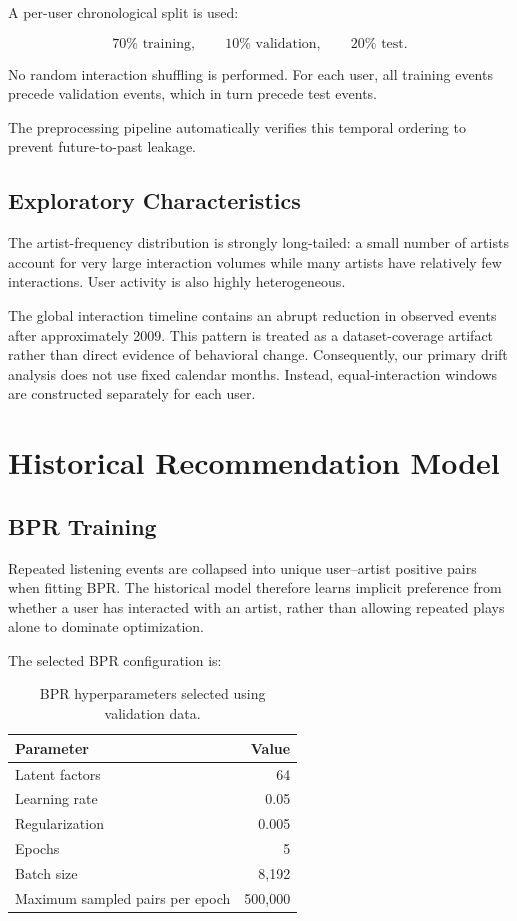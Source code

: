 \documentclass[11pt]{article}
\begin{document}
A per-user chronological split is used:

\[
70\% \text{ training},
\qquad
10\% \text{ validation},
\qquad
20\% \text{ test}.
\]

No random interaction shuffling is performed. For each user, all
training events precede validation events, which in turn precede test
events.

The preprocessing pipeline automatically verifies this temporal
ordering to prevent future-to-past leakage.

\subsection{Exploratory Characteristics}

The artist-frequency distribution is strongly long-tailed: a small
number of artists account for very large interaction volumes while
many artists have relatively few interactions. User activity is also
highly heterogeneous.

The global interaction timeline contains an abrupt reduction in
observed events after approximately 2009. This pattern is treated as a
dataset-coverage artifact rather than direct evidence of behavioral
change. Consequently, our primary drift analysis does not use fixed
calendar months. Instead, equal-interaction windows are constructed
separately for each user.


\section{Historical Recommendation Model}

\subsection{BPR Training}

Repeated listening events are collapsed into unique user--artist
positive pairs when fitting BPR. The historical model therefore learns
implicit preference from whether a user has interacted with an artist,
rather than allowing repeated plays alone to dominate optimization.

The selected BPR configuration is:

\begin{table}[H]
\centering
\caption{BPR hyperparameters selected using validation data.}
\label{tab:bprparams}
\begin{tabular}{lr}
\toprule
Parameter & Value \\
\midrule
Latent factors & 64 \\
Learning rate & 0.05 \\
Regularization & 0.005 \\
Epochs & 5 \\
Batch size & 8,192 \\
Maximum sampled pairs per epoch & 500,000 \\
\bottomrule
\end{tabular}
\end{table}
\end{document}
